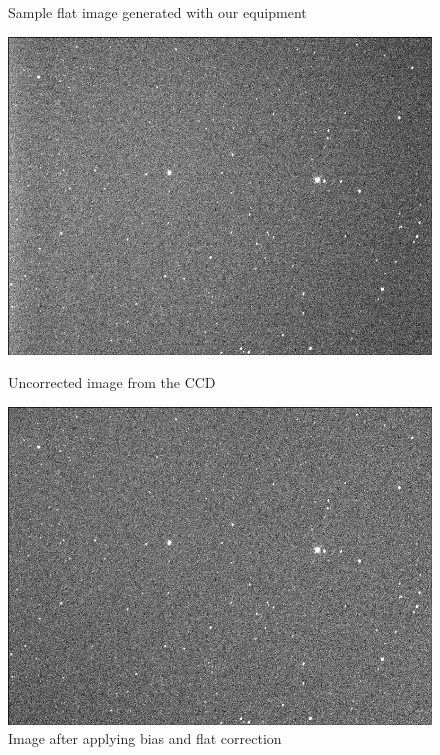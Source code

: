 \begin{figure}[ht]
\begin{minipage}[b]{\figwidth}
        \caption{Sample flat image generated with our equipment}
        \label{fig:flat_image}
    \end{minipage}
    \begin{minipage}[b]{\figwidth}
        \centering
        \includegraphics[width=\textwidth]{images/raw_image.png}
        \caption{Uncorrected image from the CCD}
        \label{fig:raw_image}
    \end{minipage}\quad\quad
    \begin{minipage}[b]{\figwidth}
        \includegraphics[width=\textwidth]{images/corrected_image.png}
        \caption{Image after applying bias and flat correction}
        \label{fig:corected_image}
    \end{minipage}
\end{figure}

